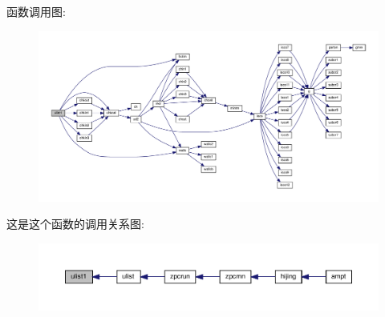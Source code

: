 函数调用图\+:
\nopagebreak
\begin{figure}[H]
\begin{center}
\leavevmode
\includegraphics[width=350pt]{ulist1_8f90_a7f104d0b9a48b9e216c87766158b5e5e_cgraph}
\end{center}
\end{figure}
这是这个函数的调用关系图\+:
\nopagebreak
\begin{figure}[H]
\begin{center}
\leavevmode
\includegraphics[width=350pt]{ulist1_8f90_a7f104d0b9a48b9e216c87766158b5e5e_icgraph}
\end{center}
\end{figure}

